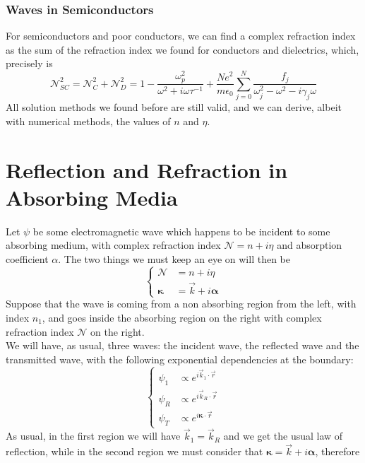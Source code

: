 \documentclass[../electromagnetism.tex]{subfiles}
\begin{document}
\subsubsection{Waves in Semiconductors}
For semiconductors and poor conductors, we can find a complex refraction index as the sum of the refraction index we found for conductors and dielectrics, which, precisely is
\begin{equation}
	\mathcal{N}^2_{SC}=\mathcal{N}^2_{C}+\mathcal{N}^2_{D}=1-\frac{\omega_p^2}{\omega^2+i\omega\tau^{-1}}+\frac{Ne^2}{m\epsilon_0}\sum_{j=0}^{N}\frac{f_j}{\omega^2_j-\omega^2-i\gamma_j\omega}
	\label{eq:semiconductorn.scsol}
\end{equation}
All solution methods we found before are still valid, and we can derive, albeit with numerical methods, the values of $n$ and $\eta$.
\section{Reflection and Refraction in Absorbing Media}
Let $\psi$ be some electromagnetic wave which happens to be incident to some absorbing medium, with complex refraction index $\mathcal{N}=n+i\eta$ and absorption coefficient $\alpha$. The two things we must keep an eye on will then be %
\begin{equation*}
	\left\{ \begin{aligned}
			\mathcal{N}&= n+i\eta\\
			\pmb{\kappa}&= \vec{k}+i\pmb{\alpha}
	\end{aligned}\right.
\end{equation*}
Suppose that the wave is coming from a non absorbing region from the left, with index $n_1$, and goes inside the absorbing region on the right with complex refraction index $\mathcal{N}$ on the right.\\
We will have, as usual, three waves: the incident wave, the reflected wave and the transmitted wave, with the following exponential dependencies at the boundary:
\begin{equation}
	\left\{ \begin{aligned}
			\psi_1&\propto e^{i\vec{k}_1\cdot\vec{r}}\\
			\psi_R&\propto e^{i\vec{k}_R\cdot\vec{r}}\\
			\psi_T&\propto e^{i\pmb{\kappa}\cdot\vec{r}}
	\end{aligned}\right.
	\label{eq:absorbingdep.rra}
\end{equation}
As usual, in the first region we will have $\vec{k}_1=\vec{k}_R$ and we get the usual law of reflection, while in the second region we must consider that $\pmb{\kappa}=\vec{k}+i\pmb{\alpha}$, therefore
\end{document}
